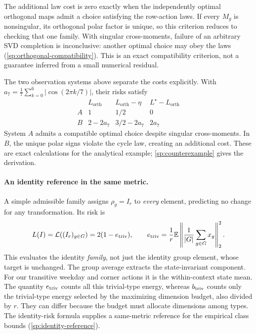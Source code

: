 The additional law cost is zero exactly when the independently optimal orthogonal maps admit a choice satisfying the row-action laws. If every $M_g$ is nonsingular, its orthogonal polar factor is unique, so this criterion reduces to checking that one family. With singular cross-moments, failure of an arbitrary SVD completion is inconclusive: another optimal choice may obey the laws (\cref{sp:orthogonal-compatibility}). This is an exact compatibility criterion, not a guarantee inferred from a small numerical residual.

The two observation systems above separate the costs explicitly. With
$a_7=\frac17\sum_{k=0}^6|\cos(2\pi k/7)|$, their risks satisfy
\[
\begin{array}{c|ccc}
 & L_{\mathrm{orth}} & L_{\mathrm{orth}}-\eta & L^\star-L_{\mathrm{orth}}\\
 \hline
 A & 1 & 1/2 & 0\\
 B & 2-2a_7 & 3/2-2a_7 & 2a_7
\end{array}
\]
System $A$ admits a compatible optimal choice despite singular cross-moments. In $B$, the unique polar signs violate the cycle law, creating an additional cost. These are exact calculations for the analytical example; \cref{sp:counterexample} gives the derivation.

\paragraph{An identity reference in the same metric.}
A simple admissible family assigns $\rho_g=I_r$ to \emph{every} element, predicting no change for any transformation. Its risk is
\begin{equation}
 L(I)=\mathcal L((I_r)_{g\in G})=2(1-e_{\rm triv}),
 \qquad
 e_{\rm triv}=\frac1r\mathbb E\left\|\frac1{|G|}\sum_{g\in G}x_g\right\|_2^2.
 \label{eq:identity-reference-main}
\end{equation}
This evaluates the identity \emph{family}, not just the identity group element, whose target is unchanged. The group average extracts the state-invariant component. For our transitive weekday and corner actions it is the within-context state mean. The quantity $e_{\rm triv}$ counts all this trivial-type energy, whereas $b_{\rm triv}$ counts only the trivial-type energy selected by the maximizing dimension budget, also divided by $r$. They can differ because the budget must allocate dimensions among types. The identity-risk formula supplies a same-metric reference for the empirical class bounds (\cref{sp:identity-reference}).

